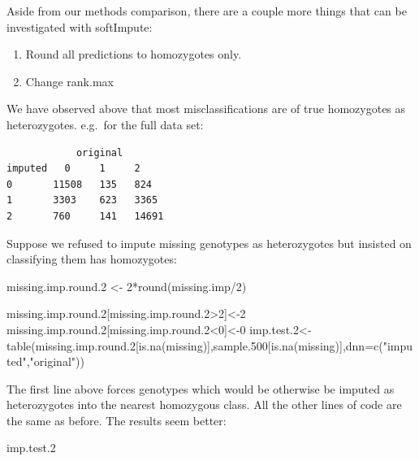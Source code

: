 \documentclass[
]{book}
\newenvironment{Shaded}{\begin{snugshade}}{\end{snugshade}}
\newcommand{\AttributeTok}[1]{\textcolor[rgb]{0.77,0.63,0.00}{#1}}
\newcommand{\DecValTok}[1]{\textcolor[rgb]{0.00,0.00,0.81}{#1}}
\newcommand{\FloatTok}[1]{\textcolor[rgb]{0.00,0.00,0.81}{#1}}
\newcommand{\FunctionTok}[1]{\textcolor[rgb]{0.00,0.00,0.00}{#1}}
\newcommand{\NormalTok}[1]{#1}
\newcommand{\OtherTok}[1]{\textcolor[rgb]{0.56,0.35,0.01}{#1}}
\newcommand{\SpecialCharTok}[1]{\textcolor[rgb]{0.00,0.00,0.00}{#1}}
\newcommand{\StringTok}[1]{\textcolor[rgb]{0.31,0.60,0.02}{#1}}
\providecommand{\tightlist}{%
  \setlength{\itemsep}{0pt}\setlength{\parskip}{0pt}}
\begin{document}
Aside from our methods comparison, there are a couple more things that can be investigated with softImpute:

\begin{enumerate}
\def\labelenumi{\alph{enumi})}
\tightlist
\item
  Round all predictions to homozygotes only.
\item
  Change rank.max
\end{enumerate}

We have observed above that most misclassifications are of true homozygotes as heterozygotes. e.g.~for the full data set:

\begin{verbatim}
            original 
imputed   0     1     2 
0       11508   135   824 
1       3303    623   3365 
2       760     141   14691 
\end{verbatim}

Suppose we refused to impute missing genotypes as heterozygotes but insisted on classifying them has homozygotes:

\begin{Shaded}
\begin{Highlighting}[]
\NormalTok{missing.imp.round}\FloatTok{.2} \OtherTok{\textless{}{-}} \DecValTok{2}\SpecialCharTok{*}\FunctionTok{round}\NormalTok{(missing.imp}\SpecialCharTok{/}\DecValTok{2}\NormalTok{)}

\NormalTok{missing.imp.round}\FloatTok{.2}\NormalTok{[missing.imp.round}\FloatTok{.2}\SpecialCharTok{\textgreater{}}\DecValTok{2}\NormalTok{]}\OtherTok{\textless{}{-}}\DecValTok{2}
\NormalTok{missing.imp.round}\FloatTok{.2}\NormalTok{[missing.imp.round}\FloatTok{.2}\SpecialCharTok{\textless{}}\DecValTok{0}\NormalTok{]}\OtherTok{\textless{}{-}}\DecValTok{0}
\NormalTok{imp.test}\FloatTok{.2}\OtherTok{\textless{}{-}}\FunctionTok{table}\NormalTok{(missing.imp.round}\FloatTok{.2}\NormalTok{[}\FunctionTok{is.na}\NormalTok{(missing)],sample}\FloatTok{.500}\NormalTok{[}\FunctionTok{is.na}\NormalTok{(missing)],}\AttributeTok{dnn=}\FunctionTok{c}\NormalTok{(}\StringTok{"imputed"}\NormalTok{,}\StringTok{"original"}\NormalTok{))}
\end{Highlighting}
\end{Shaded}

The first line above forces genotypes which would be otherwise be imputed as heterozygotes into the nearest homozygous class. All the other lines of code are the same as before. The results seem better:

\begin{Shaded}
\begin{Highlighting}[]
\NormalTok{imp.test}\FloatTok{.2}
\end{Highlighting}
\end{Shaded}
\end{document}
